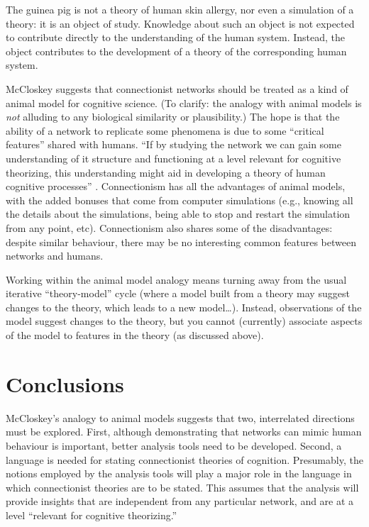 The guinea pig is not a theory of human skin allergy, nor even a simulation
of a theory:  it is an object of study.  Knowledge about such an object is
not expected to contribute directly to the understanding of the human
system.  Instead, the object contributes to the development
of a theory of the corresponding human system.

McCloskey suggests that connectionist networks should be treated as a kind
of animal model for cognitive science. (To clarify: the analogy with animal
models is {\em not\/} alluding to any biological similarity or
plausibility.) The hope is that the ability of a network to replicate some
phenomena is due to some ``critical features'' shared with humans. ``If by
studying the network we can gain some understanding of it structure and
functioning at a level relevant for cognitive theorizing, this
understanding might aid in developing a theory of human cognitive
processes'' \cite[p.~393]{mcclnetw}.  Connectionism has all the advantages
of animal models, with the added bonuses that come from computer
simulations (e.g., knowing all the details about the simulations, being
able to stop and restart the simulation from any point, etc). Connectionism
also shares some of the disadvantages: despite similar behaviour, there may
be no interesting common features between networks and humans.

Working within the animal model analogy means turning away from the usual
iterative ``theory-model'' cycle (where a model built from a theory may
suggest changes to the theory, which leads to a new model\ldots).  Instead,
observations of the model suggest changes to the theory, but you cannot
(currently) associate aspects of the model to features in the theory (as
discussed above).


\section*{Conclusions}

McCloskey's analogy to animal models suggests that two, interrelated
directions must be explored.  First, although demonstrating that networks
can mimic human behaviour is important, better analysis tools need to be
developed.  Second, a language is needed for stating connectionist theories
of
cognition.   Presumably, the notions employed by the analysis tools will
play a major role in the language in which connectionist theories are to be
stated. This assumes that the analysis will provide insights that are
independent from any particular network, and are at a level ``relevant for
cognitive theorizing.''

